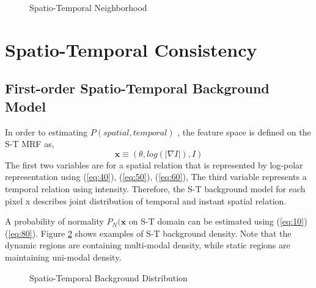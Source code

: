 \documentclass[conference]{IEEEtran}
\begin{document}
\begin{figure}[!t]
  \centering
  \label{fig:50}
  \caption{Spatio-Temporal Neighborhood}
\end{figure}


\section{Spatio-Temporal Consistency}

\subsection{First-order Spatio-Temporal Background Model}
In order to estimating \begin{math} P(spatial, temporal) \end{math} , the feature space is defined on the S-T MRF as,
\begin{equation}\label{eq:80}
  \mathbf{x} \equiv (\theta, log(|\nabla I|), I)
\end{equation}
The first two variables are for a spatial relation that is represented by log-polar representation using (\ref{eq:40}), (\ref{eq:50}), (\ref{eq:60}), The third variable represents a temporal relation using intensity. Therefore, the S-T background model for each pixel x describes joint distribution of temporal and instant spatial relation. 

A probability of normality \begin{math} P_N(\mathbf{x} \end{math}  on S-T domain can be estimated using (\ref{eq:10}) (\ref{eq:80}). Figure \ref{fig:60} shows examples of S-T background density. Note that the dynamic regions are containing multi-modal density, while static regions are maintaining uni-modal density.

\begin{figure}[!t]
  \centering
  \label{fig:60}
  \caption{Spatio-Temporal Background Distribution}
\end{figure}
\end{document}
